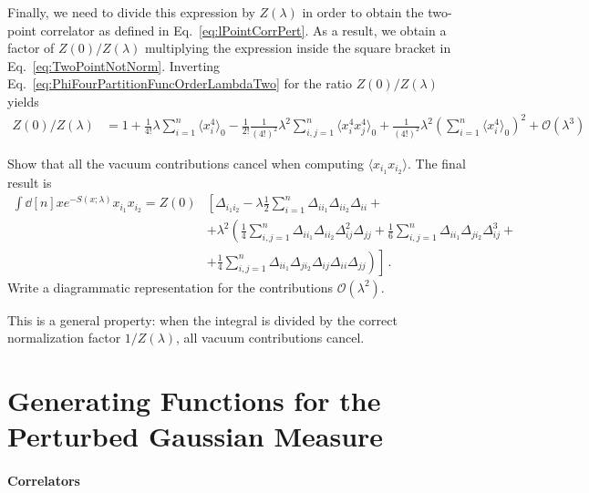 \documentclass[notes.tex]{subfiles}
\begin{document}
Finally, we need to divide this expression by $Z(\lambda)$ in order to
obtain the two-point correlator as defined in
Eq.~\ref{eq:lPointCorrPert}.  As a result, we obtain a factor of
$Z(0)/Z(\lambda)$ multiplying the expression inside the square bracket
in Eq.~\ref{eq:TwoPointNotNorm}. Inverting
Eq.~\ref{eq:PhiFourPartitionFuncOrderLambdaTwo} for the ratio
$Z(0)/Z(\lambda)$ yields
\begin{align}
  Z(0)/Z(\lambda) & =
  1 + \frac{1}{4!} \lambda \sum_{i=1}^n \langle x_i^4\rangle_0
  - \frac{1}{2!} \frac{1}{(4!)^2} \lambda^2 \sum_{i,j=1}^n
  \langle x_i^4 x_j^4\rangle_0
  + \frac{1}{(4!)^2} \lambda^2 \left(\sum_{i=1}^n \langle x_i^4\rangle_0\right)^2
  + \mathcal{O}(\lambda^3)
\end{align}

\begin{Ex}
  Show that all the vacuum contributions cancel when computing $\langle
    x_{i_1} x_{i_2}\rangle$. The final result is
  \begin{align}
    \int \dd[n]{x} e^{-S(x;\lambda)}
    x_{i_1} x_{i_2} = Z(0) &
    \left[
      \Delta_{i_1 i_2} - \lambda  \frac12 \sum_{i=1}^n
      \Delta_{i i_1} \Delta_{i i_2} \Delta_{i i}
      + \right. \nonumber                    \\
                           & \left.
      + \lambda^2 \left(
      \frac{1}{4} \sum_{i,j=1}^n \Delta_{i i_1}
      \Delta_{i i_2} \Delta_{i j}^2 \Delta_{jj}
      + \frac{1}{6} \sum_{i,j=1}^n \Delta_{i i_1}
      \Delta_{j i_2} \Delta_{i j}^3 +
      \right. \right. \nonumber              \\
      \label{eq:TwoPointNorm}
                           & + \left. \left.
      \frac{1}{4} \sum_{i,j=1}^n \Delta_{i i_1}
      \Delta_{j i_2} \Delta_{i j} \Delta_{ii}\Delta_{jj}
      \right)
      \right]\, .
  \end{align}
  Write a diagrammatic representation for the contributions $\mathcal{O}(\lambda^2)$.
\end{Ex}
This is a general property: when the integral is divided by the
correct normalization factor $1/Z(\lambda)$, all vacuum contributions
cancel.

\section{Generating Functions for the Perturbed Gaussian Measure}
\label{sec:gener-funct-pert}

\paragraph{Correlators}
\end{document}
